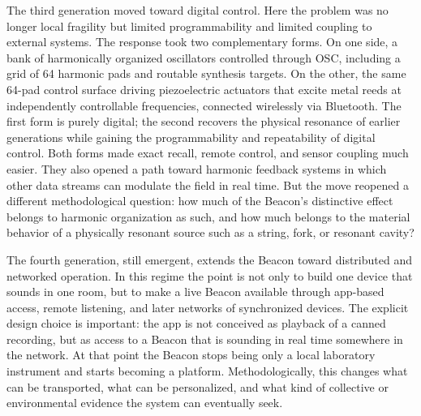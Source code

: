 The third generation moved toward digital control. Here the problem was no longer local fragility but limited programmability and limited coupling to external systems. The response took two complementary forms. On one side, a bank of harmonically organized oscillators controlled through OSC, including a grid of 64 harmonic pads and routable synthesis targets. On the other, the same 64-pad control surface driving piezoelectric actuators that excite metal reeds at independently controllable frequencies, connected wirelessly via Bluetooth. The first form is purely digital; the second recovers the physical resonance of earlier generations while gaining the programmability and repeatability of digital control. Both forms made exact recall, remote control, and sensor coupling much easier. They also opened a path toward harmonic feedback systems in which other data streams can modulate the field in real time. But the move reopened a different methodological question: how much of the Beacon's distinctive effect belongs to harmonic organization as such, and how much belongs to the material behavior of a physically resonant source such as a string, fork, or resonant cavity?

The fourth generation, still emergent, extends the Beacon toward distributed and networked operation. In this regime the point is not only to build one device that sounds in one room, but to make a live Beacon available through app-based access, remote listening, and later networks of synchronized devices. The explicit design choice is important: the app is not conceived as playback of a canned recording, but as access to a Beacon that is sounding in real time somewhere in the network. At that point the Beacon stops being only a local laboratory instrument and starts becoming a platform. Methodologically, this changes what can be transported, what can be personalized, and what kind of collective or environmental evidence the system can eventually seek.


